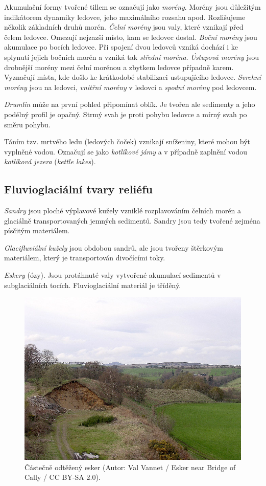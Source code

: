 Akumulační formy tvořené tillem se označují jako \emph{morény}. Morény jsou důležitým indikátorem dynamiky ledovce, jeho maximálního rozsahu apod. Rozlišujeme několik základních druhů morén. \emph{Čelní morény} jsou valy, které vznikají před čelem ledovce. Omezují nejzazší místo, kam se ledovec dostal. \emph{Boční morény} jsou akumulace po bocích ledovce. Při spojení dvou ledovců vzniká dochází i ke splynutí jejich bočních morén a vzniká tak \emph{střední moréna}. \emph{Ústupová morény} jsou drobnější morény mezi čelní morénou a zbytkem ledovce případně karem. Vyznačují místa, kde došlo ke krátkodobé stabilizaci ustupujícího ledovce. \emph{Svrchní morény} jsou na ledovci, \emph{vnitřní morény} v ledovci a \emph{spodní morény} pod ledovcem.

\emph{Drumlin} může na první pohled připomínat oblík. Je tvořen ale sedimenty a jeho podélný profil je opačný. Strmý svah je proti pohybu ledovce a mírný svah po směru pohybu. 

Táním tzv. mrtvého ledu (ledových čoček) vznikají sníženiny, které mohou být vyplněné vodou. Označují se jako \emph{kotlíkové jámy} a v případně zaplnění vodou \emph{kotlíková jezera} (\textit{kettle lakes}).

\subsection{Fluvioglaciální tvary reliéfu}
\emph{Sandry} jsou ploché výplavové kužely vzniklé rozplavováním čelních morén a glaciálně transportovaných jemných sedimentů. Sandry jsou tedy tvořené zejména písčitým materiálem. 

\emph{Glacifluviální kužely} jsou obdobou sandrů, ale jsou tvořeny štěrkovým materiálem, který je transportován divočícími toky.

\emph{Eskery} (ózy). Jsou protáhnuté valy vytvořené akumulací sedimentů v subglaciálních tocích. Fluvioglaciální materiál je tříděný.

\begin{figure}
	\centering
	\includegraphics[width=1\linewidth]{obrazky/glac/esker}
	\caption{Částečně odtěžený esker (Autor: Val Vannet / Esker near Bridge of Cally / CC BY-SA 2.0).}
	\label{fig:esker}
\end{figure}

